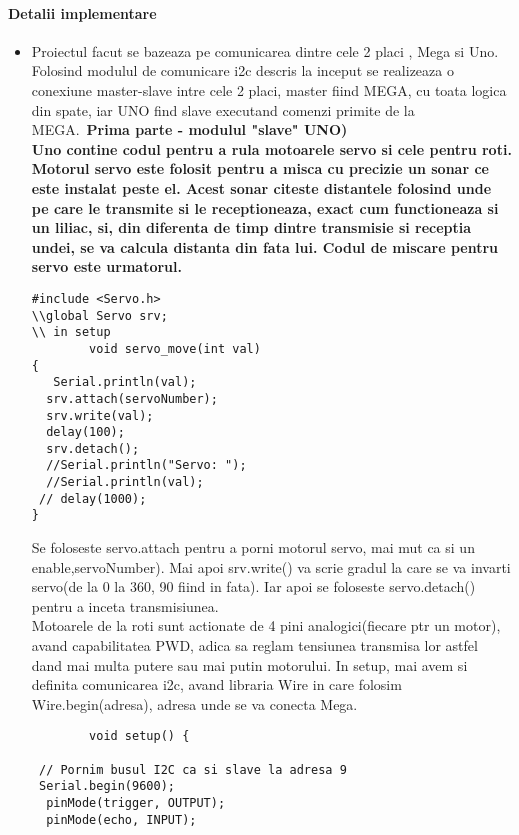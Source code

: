 \paragraph{Detalii implementare}
\begin{itemize}
\item
	\tab Proiectul facut se bazeaza pe comunicarea dintre cele 2 placi , Mega si Uno. Folosind modulul de comunicare i2c descris la inceput se realizeaza o conexiune master-slave intre cele 2 placi, master fiind MEGA, cu toata logica din spate, iar UNO find slave executand comenzi primite de la MEGA.\
	\tab\tab \bf{Prima parte - modulul "slave" UNO)}\\
	\tab Uno contine codul pentru a rula motoarele servo si cele pentru roti. Motorul servo este folosit pentru a misca cu precizie un sonar ce este instalat peste el. Acest sonar citeste distantele folosind unde pe care le transmite si le receptioneaza, exact cum functioneaza si un liliac, si, din diferenta de timp dintre transmisie si receptia undei, se va calcula distanta din fata lui. Codul de miscare pentru servo este urmatorul.\\
	\begin{verbatim}
#include <Servo.h>
\\global Servo srv;
\\ in setup 
		void servo_move(int val)
{
   Serial.println(val);
  srv.attach(servoNumber);
  srv.write(val);
  delay(100);
  srv.detach();
  //Serial.println("Servo: ");
  //Serial.println(val);
 // delay(1000);
}
	\end{verbatim}
	\tab Se foloseste servo.attach pentru a porni motorul servo, mai mut ca si un enable,servoNumber). Mai apoi srv.write() va scrie gradul la care se va invarti servo(de la 0 la 360, 90 fiind in fata). Iar apoi se foloseste servo.detach() pentru a inceta transmisiunea.\\

	\tab Motoarele de la roti sunt actionate de 4 pini analogici(fiecare ptr un motor), avand capabilitatea PWD, adica sa reglam tensiunea transmisa lor astfel dand mai multa putere sau mai putin motorului. In setup, mai avem si definita comunicarea i2c, avand libraria Wire in care folosim Wire.begin(adresa), adresa unde se va conecta Mega.\\

	\begin{verbatim}
		void setup() {

 // Pornim busul I2C ca si slave la adresa 9
 Serial.begin(9600);
  pinMode(trigger, OUTPUT);
  pinMode(echo, INPUT);


\end{verbatim}
\end{itemize}
